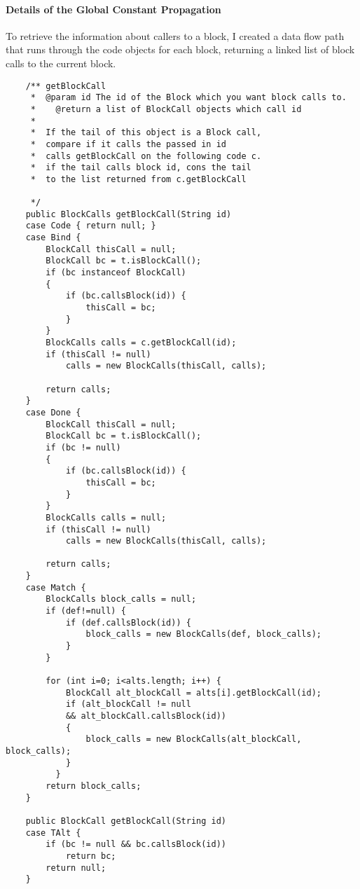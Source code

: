 \documentclass[14pt]{article}
\begin{document}
\paragraph{Details of the Global Constant Propagation}
To retrieve the information about callers to a block, I created a data flow path that runs through the code objects for each block, returning a linked list of block calls to the current block.
\begin{verbatim}
    /** getBlockCall 
     *  @param id The id of the Block which you want block calls to.
     *    @return a list of BlockCall objects which call id
     *
     *  If the tail of this object is a Block call,
     *  compare if it calls the passed in id
     *  calls getBlockCall on the following code c.
     *  if the tail calls block id, cons the tail
     *  to the list returned from c.getBlockCall
     
     */
    public BlockCalls getBlockCall(String id)
    case Code { return null; }
    case Bind {
        BlockCall thisCall = null;
        BlockCall bc = t.isBlockCall();
        if (bc instanceof BlockCall)
        {
            if (bc.callsBlock(id)) {
                thisCall = bc;
            }
        }
        BlockCalls calls = c.getBlockCall(id);
        if (thisCall != null)
            calls = new BlockCalls(thisCall, calls);
        
        return calls;
    }
    case Done { 
        BlockCall thisCall = null;
        BlockCall bc = t.isBlockCall();
        if (bc != null)
        {
            if (bc.callsBlock(id)) {
                thisCall = bc;
            }
        }
        BlockCalls calls = null;
        if (thisCall != null)
            calls = new BlockCalls(thisCall, calls);
        
        return calls;
    }
    case Match {
        BlockCalls block_calls = null;
        if (def!=null) {
            if (def.callsBlock(id)) {
                block_calls = new BlockCalls(def, block_calls);
            }
        }

        for (int i=0; i<alts.length; i++) {
            BlockCall alt_blockCall = alts[i].getBlockCall(id);
            if (alt_blockCall != null 
            && alt_blockCall.callsBlock(id))
            {
                block_calls = new BlockCalls(alt_blockCall, block_calls);
            }
          }
        return block_calls;
    }

    public BlockCall getBlockCall(String id)
    case TAlt { 
        if (bc != null && bc.callsBlock(id))
            return bc;
        return null;
    }
\end{verbatim}
\end{document}

